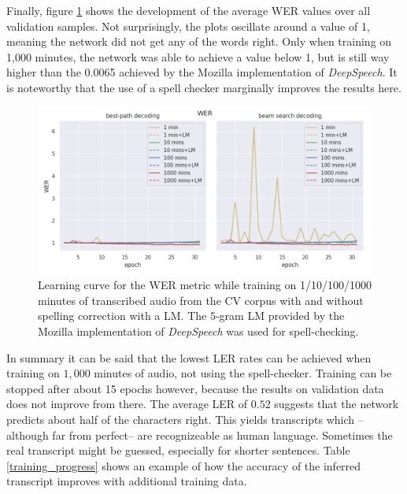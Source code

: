 Finally, figure \ref{lc_wer_cv} shows the development of the average \ac{WER} values over all validation samples. Not surprisingly, the plots oscillate around a value of 1, meaning the network did not get any of the words right. Only when training on 1,000 minutes, the network was able to achieve a value below 1, but is still way higher than the 0.0065 achieved by the Mozilla implementation of \textit{DeepSpeech}. It is noteworthy that the use of a spell checker marginally improves the results here.

\begin{figure}[h!]
	\includegraphics[width=\linewidth]{./img/lc_wer_cv.png}
	\caption{Learning curve for the \ac{WER} metric while training on 1/10/100/1000 minutes of transcribed audio from the \ac{CV} corpus with and without spelling correction with a \ac{LM}. The $5$-gram \ac{LM} provided by the Mozilla implementation of \textit{DeepSpeech} was used for spell-checking.}
	\label{lc_wer_cv}
\end{figure}

In summary it can be said that the lowest \ac{LER} rates can be achieved when training on $1,000$ minutes of audio, not using the spell-checker. Training can be stopped after about 15 epochs however, because the results on validation data does not improve from there. The average \ac{LER} of $0.52$ suggests that the network predicts about half of the characters right. This yields transcripts which -- although far from perfect-- are recognizeable as human language. Sometimes the real transcript might be guessed, especially for shorter sentences. Table \ref{training_progress} shows an example of how the accuracy of the inferred transcript improves with additional training data.

